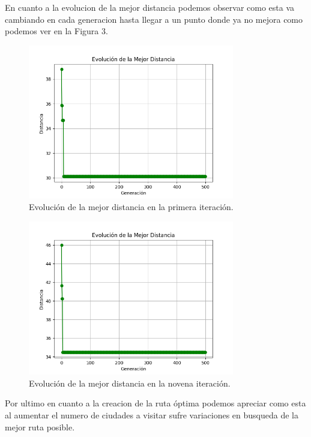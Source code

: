\documentclass{article}
\begin{document}
En cuanto a la evolucion de la mejor distancia podemos observar como esta va cambiando en cada generacion hasta llegar a un punto donde ya no  mejora como podemos ver en la Figura 3.\\
\begin{figure}[h]
\centering
\includegraphics[width=9cm]{img/101Generacion.png}
\caption{Evolución de la mejor distancia en la primera iteración.}
\label{fig:etiqueta3}
\end{figure}
\newpage

\begin{figure}[h]
  \centering
  \includegraphics[width=9cm]{img/109Generacion.png}
  \caption{Evolución de la mejor distancia en la novena iteración.}
  \label{fig:etiqueta4}
\end{figure}

Por ultimo en cuanto a la creacion de la ruta óptima podemos apreciar como esta al aumentar el numero de ciudades a visitar sufre variaciones en busqueda de la mejor ruta posible.
\end{document}
